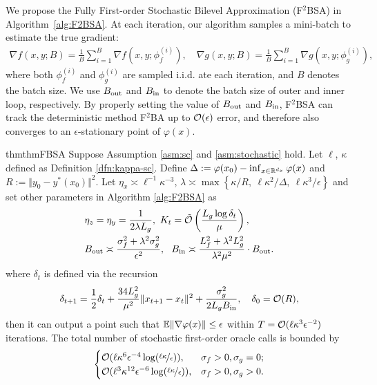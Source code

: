 \documentclass[twoside,11pt]{article}
\begin{document}
We propose the Fully First-order Stochastic Bilevel Approximation (F${}^2$BSA) in Algorithm~\ref{alg:F2BSA}. At each iteration, our algorithm samples a mini-batch to estimate the true gradient: 
\begin{align*}
    \nabla f(x,y; B) = \frac{1}{B} \sum_{i=1}^B \nabla f(x,y;\phi_f^{(i)}), \quad 
    \nabla g(x,y;B) = \frac{1}{B} \sum_{i=1}^B \nabla g(x,y;\phi_g^{(i)}),
\end{align*}
where both $\phi_f^{(i)}$ and $\phi_g^{(i)}$ are sampled i.i.d. ate each iteration, and $B$ denotes the batch size. We use $B_{\rm out}$ and $B_{\rm in}$ to denote the batch size of outer and inner loop, respectively. By properly setting the value of $B_{\rm out}$ and $B_{\rm in}$, F${}^2$BSA can track the deterministic method F${}^2$BA up to ${\mathcal{O}}(\epsilon)$ error, and therefore also converges to an $\epsilon$-stationary point of $\varphi(x)$.


\begin{restatable}{thm}{thmFBSA}\label{thm:F2BSA}
Suppose Assumption \ref{asm:sc} and \ref{asm:stochastic} hold. 
Let $\ell$,  $\kappa$ defined as Definition \ref{dfn:kappa-sc}.
Define
$\Delta:=\varphi(x_0) - \inf_{x \in {\mathbb{R}}^{d_x}} \varphi(x)$ and $R := \Vert y_0 - y^*(x_0) \Vert^2 $.
Let $\eta_x \asymp \ell^{-1}\kappa^{-3}$, $\lambda \asymp \max\left\{\kappa/R,~ \ell \kappa^2/ \Delta, ~ \ell \kappa^3 / \epsilon \right\} $
and set other parameters 
in Algorithm \ref{alg:F2BSA} as
\begin{align*}
     & \eta_z = \eta_y = \frac{1}{2 \lambda L_g},~ K_t = \tilde {{\mathcal{O}}}\left(\frac{L_g  \log \delta_t}{\mu}   \right), \\
     & B_{\rm out} \asymp  \frac{\sigma_f^2 + \lambda^2 \sigma_g^2}{\epsilon^2} , ~~ B_{\rm in} \asymp  \frac{L_f^2 + \lambda^2 L_g^2}{\lambda^2 \mu^2} \cdot B_{\rm out}. 
\end{align*}
where $\delta_t$ is defined via the recursion
\begin{align*} 
    \delta_{t+1} = \frac{1}{2}\delta_t + \frac{34 L_g^2}{\mu^2}  \Vert x_{t+1} - x_t \Vert^2 + \frac{ \sigma_g^2}{ 2 L_g B_{\rm in}}, \quad \delta_0 = {\mathcal{O}}(R),
\end{align*}
then it
can output a point such that ${\mathbb{E}} \Vert \nabla \varphi(x) \Vert \le \epsilon$ within $ T = {\mathcal{O}}( \ell \kappa^3 \epsilon^{-2})$ iterations. The total number of stochastic first-order oracle calls is bounded by
\begin{align*}
\begin{cases}
    {\mathcal{O}}(\ell \kappa^6 \epsilon^{-4} \log (\nicefrac{ \ell \kappa}{\epsilon})), & \sigma_f >0 , \sigma_g = 0;\\
    {{\mathcal{O}}(\ell^3 \kappa^{12} \epsilon^{-6} \log (\nicefrac{ \ell \kappa}{\epsilon})) }, & \sigma_f>0, \sigma_g >0.
\end{cases}
\end{align*}
\end{restatable}
\end{document}
